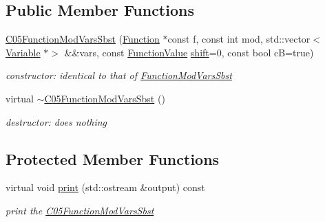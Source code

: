 \subsection*{Public Member Functions}
\begin{DoxyCompactItemize}
\item 
\mbox{\label{class_s_m_spp__di__unipi__it_1_1_c05_function_mod_vars_sbst_a7c2fa1a514ae02f3bf86215347186297}} 
\mbox{\hyperlink{class_s_m_spp__di__unipi__it_1_1_c05_function_mod_vars_sbst_a7c2fa1a514ae02f3bf86215347186297}{C05\+Function\+Mod\+Vars\+Sbst}} (\mbox{\hyperlink{class_s_m_spp__di__unipi__it_1_1_function}{Function}} $\ast$const f, const int mod, std\+::vector$<$ \mbox{\hyperlink{class_s_m_spp__di__unipi__it_1_1_variable}{Variable}} $\ast$$>$ \&\&vars, const \mbox{\hyperlink{class_s_m_spp__di__unipi__it_1_1_function_mod_a44f54e31f9fa8a29194218c234876284}{Function\+Value}} \mbox{\hyperlink{class_s_m_spp__di__unipi__it_1_1_function_mod_a177a0111cf0d0fdc5409df06c3b5e282}{shift}}=0, const bool cB=true)
\begin{DoxyCompactList}\small\item\em constructor\+: identical to that of \mbox{\hyperlink{class_s_m_spp__di__unipi__it_1_1_function_mod_vars_sbst}{Function\+Mod\+Vars\+Sbst}} \end{DoxyCompactList}\item 
\mbox{\label{class_s_m_spp__di__unipi__it_1_1_c05_function_mod_vars_sbst_a50fdad0c8cf4b39822f45612307da22a}} 
virtual \mbox{\hyperlink{class_s_m_spp__di__unipi__it_1_1_c05_function_mod_vars_sbst_a50fdad0c8cf4b39822f45612307da22a}{$\sim$\+C05\+Function\+Mod\+Vars\+Sbst}} ()
\begin{DoxyCompactList}\small\item\em destructor\+: does nothing \end{DoxyCompactList}\end{DoxyCompactItemize}
\subsection*{Protected Member Functions}
\begin{DoxyCompactItemize}
\item 
\mbox{\label{class_s_m_spp__di__unipi__it_1_1_c05_function_mod_vars_sbst_a2e7b9c9148a98c5c342e8c25cac95926}} 
virtual void \mbox{\hyperlink{class_s_m_spp__di__unipi__it_1_1_c05_function_mod_vars_sbst_a2e7b9c9148a98c5c342e8c25cac95926}{print}} (std\+::ostream \&output) const
\begin{DoxyCompactList}\small\item\em print the \mbox{\hyperlink{class_s_m_spp__di__unipi__it_1_1_c05_function_mod_vars_sbst}{C05\+Function\+Mod\+Vars\+Sbst}} \end{DoxyCompactList}\end{DoxyCompactItemize}
